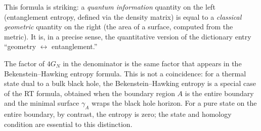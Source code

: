 \documentclass[11pt,letterpaper]{article}
\theoremstyle{plain}
\theoremstyle{definition}
\theoremstyle{remark}
\begin{document}
This formula is striking: a \emph{quantum information} quantity
on the left (entanglement entropy, defined via the density matrix) is
equal to a \emph{classical geometric} quantity on the right (the area
of a surface, computed from the metric).  It is, in a precise sense,
the quantitative version of the dictionary entry ``geometry
$\leftrightarrow$ entanglement.''

The factor of $4G_N$ in the denominator is the same factor that
appears in the Bekenstein--Hawking entropy formula.  This is not a
coincidence: for a thermal state dual to a bulk black hole, the
Bekenstein--Hawking entropy is a special case of the RT formula,
obtained when the boundary region $A$ is the entire boundary and the
minimal surface $\gamma_A$ wraps the black hole horizon. For a pure
state on the entire boundary, by contrast, the entropy is zero; the state
and homology condition are essential to this distinction.
\end{document}
